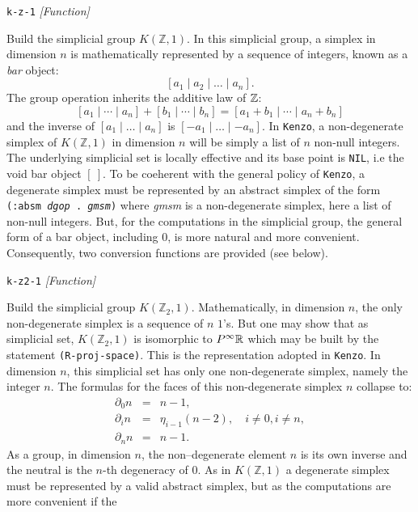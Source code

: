 {\parindent=0mm
{\leftskip=5mm
{\tt k-z-1}  \hfill {\em [Function]} \par}
{\leftskip=15mm
Build the simplicial group $K(\mathbb{Z},1)$. In this simplicial group, a  simplex  in dimension $n$
is mathematically represented by a sequence of integers, known as a {\em bar} object:
$$ [a_1 \mid a_2 \mid \ldots \mid a_n]. $$
The group operation inherits the additive law of ${\mathbb{Z}}$:
$$[a_1  \mid \cdots \mid a_n] + [b_1 \mid \cdots \mid b_n] = [a_1+b_1 \mid \cdots \mid a_n+b_n]$$
and the inverse of $[a_1  \mid \ldots \mid a_n]$ is $[-a_1 \mid \ldots \mid -a_n]. $
In {\tt Kenzo}, a non-degenerate simplex of $K(\mathbb{Z},1)$ in dimension $n$ will be simply
a list of $n$ non-null integers.
The underlying simplicial set is locally effective and its base point is {\tt NIL}, i.e the void bar object
$[\ ]$. To be coeherent with the general policy of {\tt Kenzo}, a degenerate simplex must be represented by
an abstract simplex of the form {\tt (:absm {\em dgop} . {\em gmsm})} where {\em gmsm} is a non-degenerate
simplex, here a list of non-null integers. But, for the computations in the simplicial group, the
general form of a bar object, including $0$, is more natural and more convenient. Consequently, two conversion
functions are provided (see below). \par}
{\leftskip=5mm
{\tt k-z2-1}  \hfill {\em [Function]} \par}
{\leftskip=15mm
Build the simplicial group $K(\mathbb{Z}_2,1)$.
Mathematically, in dimension $n$, the only non-degenerate simplex is
a sequence of $n$ $1$'s. But one may show that as simplicial set, $K(\mathbb{Z}_2,1)$ is  isomorphic to
$P^\infty {{\mathbb{R}}}$ which may be built by the statement {\tt (R-proj-space)}. This is the representation
adopted in {\tt Kenzo}. In dimension $n$, this
simplicial set has only one non-degenerate simplex, namely the integer $n$. The formulas for the faces of this
non-degenerate simplex $n$ collapse to:
\begin{eqnarray*}
\partial_0 n & = & n-1, \\
\partial_i n & = & \eta_{i-1} (n-2), \quad i \not= 0, i \not=n,  \\
\partial_n n & = & n-1.
\end{eqnarray*}
As a group, in dimension $n$, the non--degenerate element $n$
is its own inverse and the neutral is the $n$-th degeneracy of $0$. As in $K(\mathbb{Z}, 1)$ a degenerate simplex
must be represented by a valid abstract simplex, but as the computations are more convenient if the
}}
